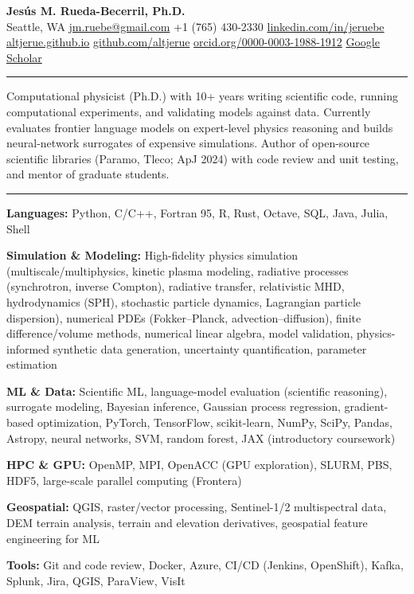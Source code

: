 \documentclass[10pt,letterpaper]{article}
\newcommand{\cvsection}[1]{%
  \vspace{5pt}{\large\bfseries #1}\par\nopagebreak\vspace{2pt}\hrule
  \nopagebreak\vspace{3pt}\nopagebreak}
\begin{document}
\begin{center}
  {\LARGE\bfseries Jesús M. Rueda-Becerril, Ph.D.}\\[3pt]
  Seattle, WA \textbar{} \href{mailto:jm.ruebe@gmail.com}{jm.ruebe@gmail.com} \textbar{} +1 (765) 430-2330 \textbar{} \href{https://linkedin.com/in/jeruebe}{linkedin.com/in/jeruebe}\\
  \href{https://altjerue.github.io}{altjerue.github.io} \textbar{} \href{https://github.com/altjerue}{github.com/altjerue} \textbar{} \href{https://orcid.org/0000-0003-1988-1912}{orcid.org/0000-0003-1988-1912} \textbar{} \href{https://scholar.google.com/citations?user=hrld5zgAAAAJ}{Google Scholar}
\end{center}

\cvsection{Professional Summary}
Computational physicist (Ph.D.) with 10+ years writing scientific code, running computational experiments, and validating models against data. Currently evaluates frontier language models on expert-level physics reasoning and builds neural-network surrogates of expensive simulations. Author of open-source scientific libraries (Paramo, Tleco; ApJ 2024) with code review and unit testing, and mentor of graduate students.\par

\cvsection{Skills}
\textbf{Languages:} Python, C/C++, Fortran 95, R, Rust, Octave, SQL, Java, Julia, Shell\par
\textbf{Simulation \& Modeling:} High-fidelity physics simulation (multiscale/multiphysics, kinetic plasma modeling, radiative processes (synchrotron, inverse Compton), radiative transfer, relativistic MHD, hydrodynamics (SPH), stochastic particle dynamics, Lagrangian particle dispersion), numerical PDEs (Fokker–Planck, advection–diffusion), finite difference/volume methods, numerical linear algebra, model validation, physics-informed synthetic data generation, uncertainty quantification, parameter estimation\par
\textbf{ML \& Data:} Scientific ML, language-model evaluation (scientific reasoning), surrogate modeling, Bayesian inference, Gaussian process regression, gradient-based optimization, PyTorch, TensorFlow, scikit-learn, NumPy, SciPy, Pandas, Astropy, neural networks, SVM, random forest, JAX (introductory coursework)\par
\textbf{HPC \& GPU:} OpenMP, MPI, OpenACC (GPU exploration), SLURM, PBS, HDF5, large-scale parallel computing (Frontera)\par
\textbf{Geospatial:} QGIS, raster/vector processing, Sentinel-1/2 multispectral data, DEM terrain analysis, terrain and elevation derivatives, geospatial feature engineering for ML\par
\textbf{Tools:} Git and code review, Docker, Azure, CI/CD (Jenkins, OpenShift), Kafka, Splunk, Jira, QGIS, ParaView, VisIt\par
\end{document}
